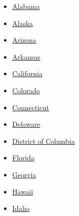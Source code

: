 \begin{itemize}
\tightlist
\item
  \href{//www.nytimes3xbfgragh.onion/elections/2016/results/alabama}{Alabama}
\item
  \href{//www.nytimes3xbfgragh.onion/elections/2016/results/alaska}{Alaska}
\item
  \href{//www.nytimes3xbfgragh.onion/elections/2016/results/arizona}{Arizona}
\item
  \href{//www.nytimes3xbfgragh.onion/elections/2016/results/arkansas}{Arkansas}
\item
  \href{//www.nytimes3xbfgragh.onion/elections/2016/results/california}{California}
\item
  \href{//www.nytimes3xbfgragh.onion/elections/2016/results/colorado}{Colorado}
\item
  \href{//www.nytimes3xbfgragh.onion/elections/2016/results/connecticut}{Connecticut}
\item
  \href{//www.nytimes3xbfgragh.onion/elections/2016/results/delaware}{Delaware}
\item
  \href{//www.nytimes3xbfgragh.onion/elections/2016/results/district-of-columbia}{District
  of Columbia}
\item
  \href{//www.nytimes3xbfgragh.onion/elections/2016/results/florida}{Florida}
\item
  \href{//www.nytimes3xbfgragh.onion/elections/2016/results/georgia}{Georgia}
\item
  \href{//www.nytimes3xbfgragh.onion/elections/2016/results/hawaii}{Hawaii}
\item
  \href{//www.nytimes3xbfgragh.onion/elections/2016/results/idaho}{Idaho}
\end{itemize}

